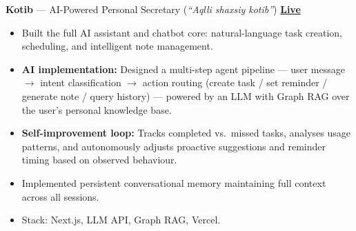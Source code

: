 \documentclass[11pt,a4paper]{article}
\begin{document}
\textbf{Kotib} --- AI-Powered Personal Secretary (\textit{``Aqlli shaxsiy kotib''}) \hfill {\large\textbf{\href{https://kotib-rouge.vercel.app/}{Live}}}
\begin{itemize}
    \item Built the full AI assistant and chatbot core: natural-language task creation, scheduling,
and intelligent note management.
    \item \textbf{AI implementation:} Designed a multi-step agent pipeline --- user message $\rightarrow$ intent
classification $\rightarrow$ action routing (create task / set reminder / generate note / query history)
--- powered by an LLM with Graph RAG over the user's personal knowledge base.
    \item \textbf{Self-improvement loop:} Tracks completed vs.\ missed tasks, analyses usage patterns,
and autonomously adjusts proactive suggestions and reminder timing based on observed
behaviour.
    \item Implemented persistent conversational memory maintaining full context across all sessions.
    \item Stack: Next.js, LLM API, Graph RAG, Vercel.
\end{itemize}

\end{document}
